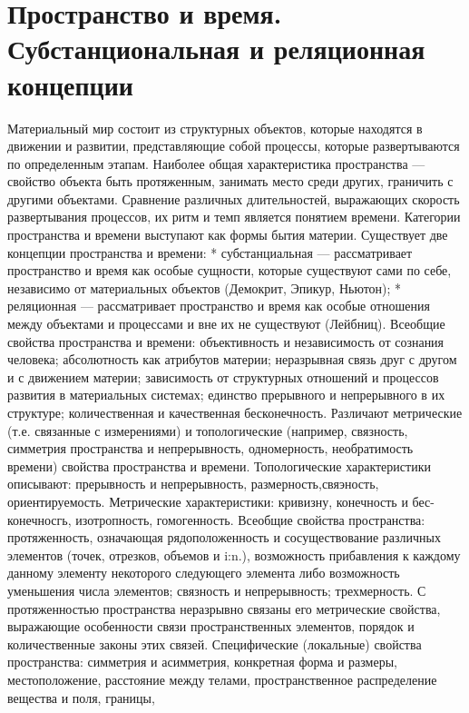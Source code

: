 \documentclass[12pt]{article}
\begin{document}
\section{Пространство и время. Субстанциональная и реляционная концепции}
Материальный  мир  состоит  из  структурных  объектов,  которые  находятся  в  движении  и  развитии,
представляющие собой процессы, которые развертываются по определенным этапам.
Наиболее общая характеристика пространства — свойство объекта быть протяженным, занимать место среди
других, граничить с другими объектами.
Сравнение  различных  длительностей,  выражающих  скорость  развертывания  процессов,  их  ритм  и  темп
является понятием времени.
Категории  пространства  и  времени  выступают  как  формы  бытия  материи.  Существует  две  концепции
пространства и времени:
* субстанциальная — рассматривает пространство и время как особые сущности, которые существуют сами
по себе, независимо от материальных объектов (Демокрит, Эпикур, Ньютон);
* реляционная — рассматривает пространство и время как особые отношения между объектами и процессами
и вне их не существуют (Лейбниц).
Всеобщие  свойства  пространства  и  времени:  объективность  и  независимость  от  сознания  человека;
абсолютность как атрибутов материи; неразрывная связь друг с другом и с движением материи; зависимость от
структурных отношений и процессов развития в материальных системах; единство прерывного и непрерывного
в их структуре; количественная и качественная бесконечность.
Различают метрические (т.е. связанные с измерениями) и топологические (например, связность, симметрия
пространства и непрерывность, одномерность, необратимость времени) свойства пространства и времени.
Топологические  характеристики  описывают:  прерывность  и  непрерывность,  размерность,свяэность,
ориентируемость.
Метрические характеристики: кривизну, конечность и бес-конечносгь, изотропность, гомогенность.
Всеобщие  свойства  пространства:  протяженность,  означающая  рядоположенность  и  сосуществование
различных элементов (точек, отрезков, объемов и i:n.), возможность прибавления к каждому данному элементу
некоторого следующего элемента либо возможность уменьшения числа элементов; связность и непрерывность;
трехмерность.
С протяженностью пространства неразрывно связаны его метрические свойства, выражающие особенности
связи пространственных элементов, порядок и количественные законы этих связей.
Специфические (локальные) свойства пространства: симметрия и асимметрия, конкретная форма и размеры,
местоположение,  расстояние  между  телами,  пространственное  распределение  вещества  и  поля,  границы,
\end{document}

